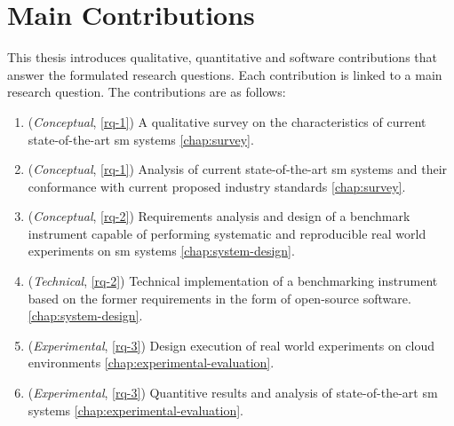 \section{Main Contributions}
\label{sec:introduction:contributions}

This thesis introduces qualitative, quantitative and software contributions that answer the formulated research questions. Each contribution is linked to a main research question. The contributions are as follows:



\begin{enumerate}
    \item (\textit{Conceptual}, \ref{rq-1}) A qualitative survey on the characteristics of current state-of-the-art \gls{sm} systems \cref{chap:survey}.
    
    \item (\textit{Conceptual}, \ref{rq-1}) Analysis of current state-of-the-art \gls{sm} systems and their conformance with current proposed industry standards \cref{chap:survey}.    
    
    \item (\textit{Conceptual}, \ref{rq-2}) Requirements analysis and design of a benchmark instrument capable of performing systematic and reproducible real world experiments on \gls{sm} systems \cref{chap:system-design}.  
    
    \item (\textit{Technical}, \ref{rq-2}) Technical implementation of a benchmarking instrument based on the former requirements in the form of open-source software. \cref{chap:system-design}.

    \item (\textit{Experimental}, \ref{rq-3}) Design execution of real world experiments on cloud environments \cref{chap:experimental-evaluation}.
    
    \item (\textit{Experimental}, \ref{rq-3}) Quantitive results and analysis of state-of-the-art \gls{sm} systems \cref{chap:experimental-evaluation}.
\end{enumerate}


 

